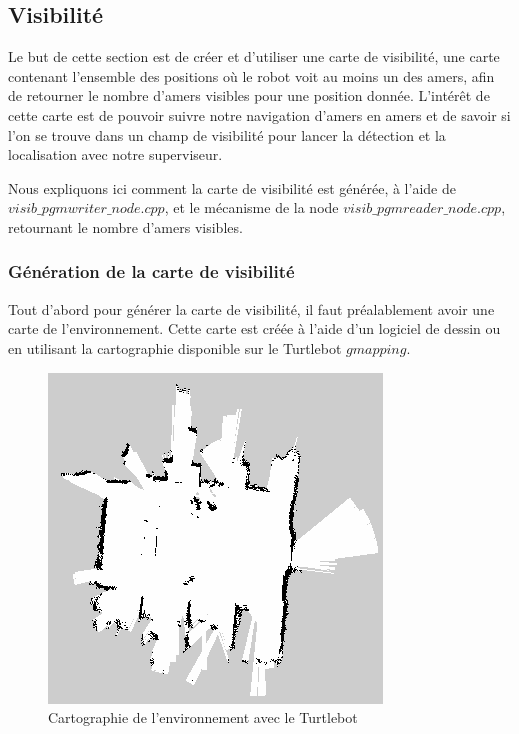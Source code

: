 \documentclass[10pt,a4paper]{article}
\begin{document}
\subsection{Visibilité}
\label{sec:visibilite}

Le but de cette section est de créer et d'utiliser une carte de visibilité, une carte contenant l'ensemble des positions où le robot voit au moins un des amers, afin de retourner le nombre d'amers visibles pour une position donnée. L’intérêt de cette carte est de pouvoir suivre notre navigation d'amers en amers et de savoir si l'on se trouve dans un champ de visibilité pour lancer la détection et la localisation avec notre superviseur.

Nous expliquons ici comment la carte de visibilité est générée, à l'aide de $visib\_pgmwriter\_node.cpp$, et le mécanisme de la node $visib\_pgmreader\_node.cpp$, retournant le nombre d'amers visibles.

\subsubsection{Génération de la carte de visibilité}
Tout d'abord pour générer la carte de visibilité, il faut préalablement avoir une carte de l'environnement. Cette carte est créée à l'aide d'un logiciel de dessin ou en utilisant la cartographie disponible sur le Turtlebot $gmapping$.

\begin{figure}[!h]
\center
\includegraphics[scale=0.6]{figures/aip_map.png} 
\caption{Cartographie de l'environnement avec le Turtlebot}	
\end{figure}
\end{document}
